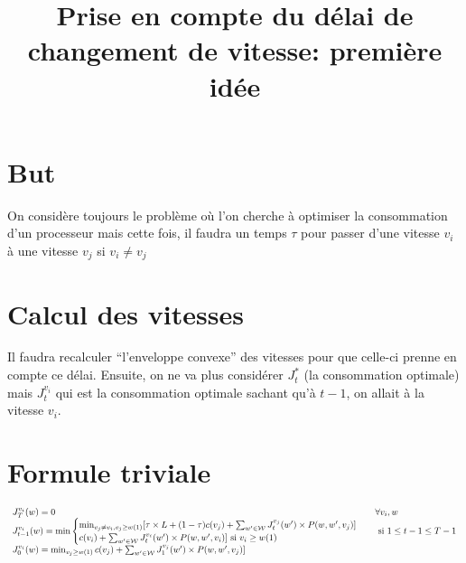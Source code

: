 \documentclass[10pt,a4paper]{article}
\title{Prise en compte du délai de changement de vitesse: première idée}
\begin{document}
\maketitle

\section{But}
On considère toujours le problème où l'on cherche à optimiser la
consommation d'un processeur mais cette fois, il faudra un temps
$\tau$ pour passer d'une vitesse $v_i$ à une vitesse $v_j$ si $v_i\neq
v_j$

\section{Calcul des vitesses}
Il faudra recalculer ``l'enveloppe convexe'' des vitesses pour que
celle-ci prenne en compte ce délai. Ensuite, on ne va plus considérer
$J_t^*$ (la consommation optimale) mais $J_t^{v_i}$ qui est la
consommation optimale sachant qu'à $t-1$, on allait à la vitesse $v_i$.

\section{Formule triviale}

\begin{equation}
  \resizebox{1.3\hsize}{!}{$
    \begin{array}{ll}
      J_T^{v_i}(w)=0 & \forall v_i, w\\
      J_{t-1}^{v_i}(w) = \min
      \begin{cases} 
        \min_{v_j\neq v_i, v_j\geq w(1)} [\tau
        \times L+(1-\tau)c(v_j)+\sum_{w'\in\mathcal{W}}J_t^{v_j}(w')\times
        P(w,w',v_j)]\\
        c(v_i)+\sum_{w'\in\mathcal{W}}J_t^{v_i}(w')\times P(w,w',v_i)]
        \text{ si } v_i\geq w(1)

      \end{cases} & \text{ si } 1\leq t-1 \leq T-1 \\
      
      J_0^{v_i}(w) = \min_{v_j\geq w(1)}c(v_j)+\sum_{w'\in\mathcal{W}}J_1^{v_j}(w')\times P(w,w',v_j)]

    \end{array}
  $}
\end{equation}
\end{document}
